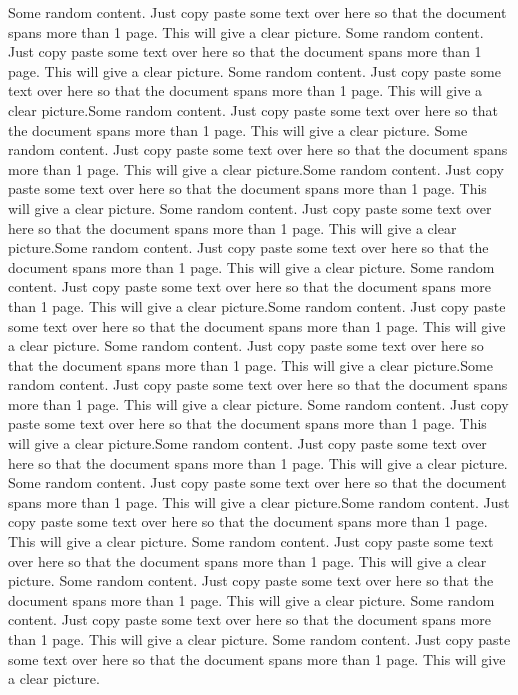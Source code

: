 \documentclass{article}
\begin{document}
	Some random content. Just copy paste some text over here so that the document spans more than 1 page. This will give a clear picture.
	Some random content. Just copy paste some text over here so that the document spans more than 1 page. This will give a clear picture.
	Some random content. Just copy paste some text over here so that the document spans more than 1 page. This will give a clear picture.Some random content. Just copy paste some text over here so that the document spans more than 1 page. This will give a clear picture.
	Some random content. Just copy paste some text over here so that the document spans more than 1 page. This will give a clear picture.Some random content. Just copy paste some text over here so that the document spans more than 1 page. This will give a clear picture.
	Some random content. Just copy paste some text over here so that the document spans more than 1 page. This will give a clear picture.Some random content. Just copy paste some text over here so that the document spans more than 1 page. This will give a clear picture.
	Some random content. Just copy paste some text over here so that the document spans more than 1 page. This will give a clear picture.Some random content. Just copy paste some text over here so that the document spans more than 1 page. This will give a clear picture.
	Some random content. Just copy paste some text over here so that the document spans more than 1 page. This will give a clear picture.Some random content. Just copy paste some text over here so that the document spans more than 1 page. This will give a clear picture.
	Some random content. Just copy paste some text over here so that the document spans more than 1 page. This will give a clear picture.Some random content. Just copy paste some text over here so that the document spans more than 1 page. This will give a clear picture.
	Some random content. Just copy paste some text over here so that the document spans more than 1 page. This will give a clear picture.Some random content. Just copy paste some text over here so that the document spans more than 1 page. This will give a clear picture.
	Some random content. Just copy paste some text over here so that the document spans more than 1 page. This will give a clear picture.
	Some random content. Just copy paste some text over here so that the document spans more than 1 page. This will give a clear picture.
	Some random content. Just copy paste some text over here so that the document spans more than 1 page. This will give a clear picture.
	Some random content. Just copy paste some text over here so that the document spans more than 1 page. This will give a clear picture.
\end{document}
